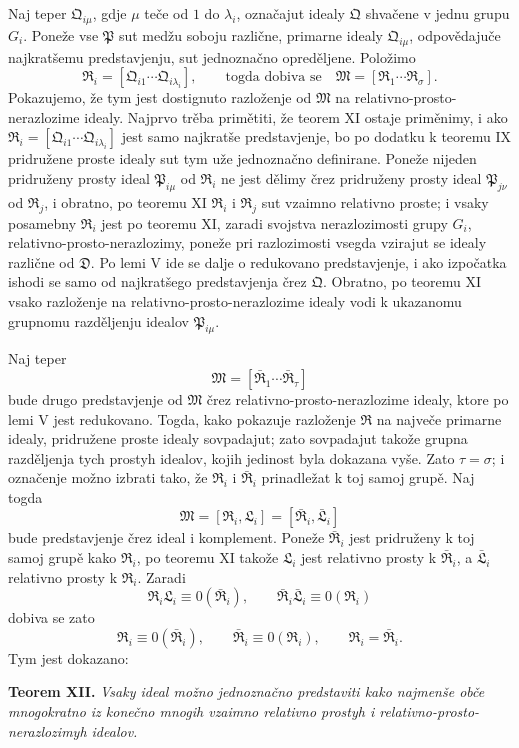\documentclass[11pt]{article}
\newcommand{\ideal}[1]{\mathfrak{#1}}
\begin{document}
Naj teper \(\ideal Q_{i\mu}\), gdje \(\mu\) teče od \(1\) do \(\lambda_i\), označajut idealy \(\ideal Q\) shvačene v jednu grupu \(G_i\). Poneže vse \(\ideal P\) sut medžu soboju različne, primarne idealy \(\ideal Q_{i\mu}\), odpovědajuče najkratšemu predstavjenju, sut jednoznačno opreděljene. Položimo
\[
 \ideal R_i=[\ideal Q_{i1}\cdots\ideal Q_{i\lambda_i}],\qquad
 \text{togda dobiva se}\quad
 \ideal M=[\ideal R_1\cdots\ideal R_\sigma].
\]
Pokazujemo, že tym jest dostignuto razloženje od \(\ideal M\) na relativno-prosto-nerazlozime idealy. Najprvo trěba primětiti, že teorem XI ostaje priměnimy, i ako \(\ideal R_i=[\ideal Q_{i1}\cdots\ideal Q_{i\lambda_i}]\) jest samo najkratše predstavjenje, bo po dodatku k teoremu IX pridružene proste idealy sut tym uže jednoznačno definirane. Poneže nijeden pridruženy prosty ideal \(\ideal P_{i\mu}\) od \(\ideal R_i\) ne jest dělimy črez pridruženy prosty ideal \(\ideal P_{j\nu}\) od \(\ideal R_j\), i obratno, po teoremu XI \(\ideal R_i\) i \(\ideal R_j\) sut vzaimno relativno proste; i vsaky posamebny \(\ideal R_i\) jest po teoremu XI, zaradi svojstva nerazlozimosti grupy \(G_i\), relativno-prosto-nerazlozimy, poneže pri razlozimosti vsegda vzirajut se idealy različne od \(\ideal D\). Po lemi V ide se dalje o redukovano predstavjenje, i ako izpočatka ishodi se samo od najkratšego predstavjenja črez \(\ideal Q\). Obratno, po teoremu XI vsako razloženje na relativno-prosto-nerazlozime idealy vodi k ukazanomu grupnomu razděljenju idealov \(\ideal P_{i\mu}\).

Naj teper
\[
 \ideal M=[\bar{\ideal R}_1\cdots\bar{\ideal R}_\tau]
\]
bude drugo predstavjenje od \(\ideal M\) črez relativno-prosto-nerazlozime idealy, ktore po lemi V jest redukovano. Togda, kako pokazuje razloženje \(\ideal R\) na največe primarne idealy, pridružene proste idealy sovpadajut; zato sovpadajut takože grupna razděljenja tych prostyh idealov, kojih jedinost byla dokazana vyše. Zato \(\tau=\sigma\); i označenje možno izbrati tako, že \(\ideal R_i\) i \(\bar{\ideal R}_i\) prinadležat k toj samoj grupě. Naj togda
\[
 \ideal M=[\ideal R_i,\ideal L_i]=[\bar{\ideal R}_i,\bar{\ideal L}_i]
\]
bude predstavjenje črez ideal i komplement. Poneže \(\bar{\ideal R}_i\) jest pridruženy k toj samoj grupě kako \(\ideal R_i\), po teoremu XI takože \(\ideal L_i\) jest relativno prosty k \(\bar{\ideal R}_i\), a \(\bar{\ideal L}_i\) relativno prosty k \(\ideal R_i\). Zaradi
\[
 \ideal R_i\ideal L_i\equiv0(\bar{\ideal R}_i),
 \qquad
 \bar{\ideal R}_i\bar{\ideal L}_i\equiv0(\ideal R_i)
\]
dobiva se zato
\[
 \ideal R_i\equiv0(\bar{\ideal R}_i),
 \qquad
 \bar{\ideal R}_i\equiv0(\ideal R_i),
 \qquad
 \ideal R_i=\bar{\ideal R}_i.
\]
Tym jest dokazano:

\textbf{Teorem XII.} \emph{Vsaky ideal možno jednoznačno predstaviti kako najmenše obče mnogokratno iz konečno mnogih vzaimno relativno prostyh i relativno-prosto-nerazlozimyh idealov.}
\end{document}
